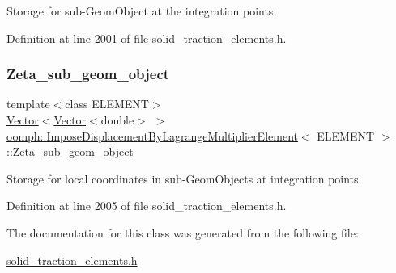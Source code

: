 Storage for sub-\/\+Geom\+Object at the integration points. 



Definition at line 2001 of file solid\+\_\+traction\+\_\+elements.\+h.

\mbox{\label{classoomph_1_1ImposeDisplacementByLagrangeMultiplierElement_a05446a83806527c72790c3f001ff9cec}} 
\subsubsection{\texorpdfstring{Zeta\+\_\+sub\+\_\+geom\+\_\+object}{Zeta\_sub\_geom\_object}}
{\footnotesize\ttfamily template$<$class E\+L\+E\+M\+E\+NT$>$ \\
\hyperlink{classoomph_1_1Vector}{Vector}$<$\hyperlink{classoomph_1_1Vector}{Vector}$<$double$>$ $>$ \hyperlink{classoomph_1_1ImposeDisplacementByLagrangeMultiplierElement}{oomph\+::\+Impose\+Displacement\+By\+Lagrange\+Multiplier\+Element}$<$ E\+L\+E\+M\+E\+NT $>$\+::Zeta\+\_\+sub\+\_\+geom\+\_\+object\hspace{0.3cm}{\ttfamily [protected]}}



Storage for local coordinates in sub-\/\+Geom\+Objects at integration points. 



Definition at line 2005 of file solid\+\_\+traction\+\_\+elements.\+h.



The documentation for this class was generated from the following file\+:\begin{DoxyCompactItemize}
\item 
\hyperlink{solid__traction__elements_8h}{solid\+\_\+traction\+\_\+elements.\+h}\end{DoxyCompactItemize}
